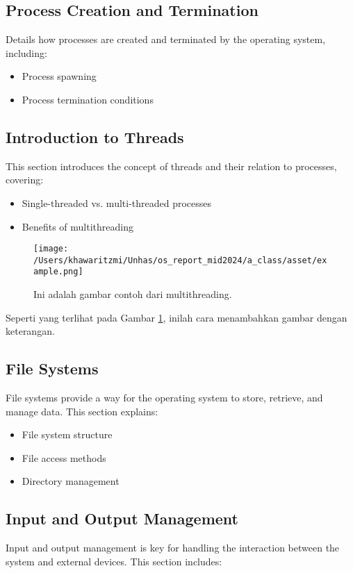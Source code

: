 \documentclass[12pt]{article}
\begin{document}
\subsection{Process Creation and Termination}
Details how processes are created and terminated by the operating system, including:
\begin{itemize}
    \item Process spawning
    \item Process termination conditions
\end{itemize}

\subsection{Introduction to Threads}
This section introduces the concept of threads and their relation to processes, covering:
\begin{itemize}
    \item Single-threaded vs. multi-threaded processes
    \item Benefits of multithreading
\end{itemize}

\begin{figure}[h]
    \centering
    \texttt{[image: /Users/khawaritzmi/Unhas/os\_report\_mid2024/a\_class/asset/example.png]}  %
    \caption{Ini adalah gambar contoh dari multithreading.}
    \label{fig:contoh_gambar}
\end{figure}

Seperti yang terlihat pada Gambar \ref{fig:contoh_gambar}, inilah cara menambahkan gambar dengan keterangan.

\subsection{File Systems}
File systems provide a way for the operating system to store, retrieve, and manage data. This section explains:
\begin{itemize}
    \item File system structure
    \item File access methods
    \item Directory management
\end{itemize}

\subsection{Input and Output Management}
Input and output management is key for handling the interaction between the system and external devices. This section includes:
\end{document}
